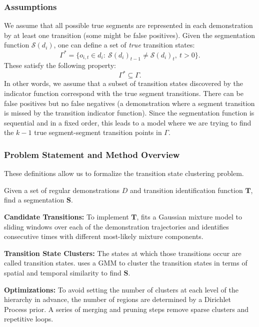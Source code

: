 \subsubsection{Assumptions}
We assume that all possible true segments are represented in each demonstration by at least one transition (some might be false positives).
Given the segmentation function $\mathcal{S}(d_i)$, one can define a set of \emph{true} transition states:
\[\Gamma^* = \{
o_{i,t} \in d_i : ~\mathcal{S}(d_i)_{t-1} \ne \mathcal{S}(d_i)_t,~ t > 0\}.
\]
These satisfy the following property:
\[
 \Gamma^* \subseteq \Gamma.
\]
In other words, we assume that a subset of transition states discovered by the indicator function correspond with the true segment transitions.
There can be false positives but no false negatives (a demonstration where a segment transition is missed by the transition indicator function).
Since the segmentation function is sequential and in a fixed order, this leads to a model where we are trying to find the $k-1$ true segment-segment transition points in $\Gamma$.

\subsubsection{Problem Statement and Method Overview}\label{ps}
These definitions allow us to formalize the transition state clustering problem. 

\begin{problem}
Given a set of regular demonstrations $D$ and transition identification function $\mathbf{T}$, find a segmentation $\mathbf{S}$.
\end{problem}

\noindent \textbf{Candidate Transitions: } To implement $\mathbf{T}$, \tsc fits a Gaussian mixture model to sliding windows over each of the demonstration trajectories and identifies consecutive times with different most-likely mixture components.

\vspace{0.25em}

\noindent \textbf{Transition State Clusters: } The states at which those transitions occur are called transition states.
\tsc uses a GMM to cluster the transition states in terms of spatial and temporal similarity to find $\mathbf{S}$.

\vspace{0.25em}

\noindent \textbf{Optimizations: } To avoid setting the number of clusters at each level of the hierarchy in advance, the number of regions are determined by a Dirichlet Process prior.
A series of merging and pruning steps remove sparse clusters and repetitive loops.

